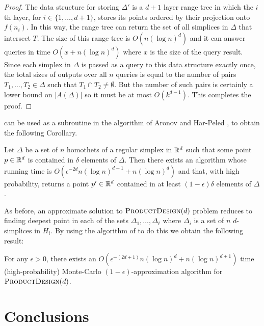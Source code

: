 \documentclass[lotsofwhite]{patmorin}
\newcommand{\eps}{\epsilon}
\begin{document}
\begin{proof}
  The data structure for storing $\Delta'$ is a $d+1$ layer range tree
  \cite{b75} in which the $i$th layer, for $i\in\{1,\ldots,d+1\}$,
  stores its points ordered by their projection onto $f(n_i)$.  In this
  way, the range tree can return the set of all simplices in $\Delta$ that
  intersect $T$.  The size of this range tree is $O(n(\log n)^{d})$
  and it can answer queries in time $O(x+n(\log n)^{d})$ where $x$
  is the size of the query result.  Since each simplex in $\Delta$
  is passed as a query to this data structure exactly once, the total
  sizes of outputs over all $n$ queries is equal to the number of
  pairs $T_1,\ldots,T_2\in\Delta$ such that $T_1\cap T_2\neq\emptyset$.
  But the number of such pairs is certainly a lower bound on $|A(\Delta)|$
  so it must be at most $O(k^{d-1})$.  This completes the proof.
\end{proof}

 can be used as a subroutine in the
algorithm of Aronov and Har-Peled \cite[Theorem~3.3]{ah08}, to obtain
the following Corollary.

\begin{cor}
  Let $\Delta$ be a set of $n$ homothets of a regular simplex in $\mathbb{R}^d$
  such that some point $p\in\mathbb{R}^d$ is contained in $\delta$ elements
  of $\Delta$.  Then there exists an algorithm whose running time is
  $O(\eps^{-2d}n(\log n)^{d-1} + n(\log n)^d)$ and that, with high
  probability, returns a point $p'\in\mathbb{R}^{d}$ contained in at least
  $(1-\eps)\delta$ elements of $\Delta$.
\end{cor}

As before, an approximate solution to $\textsc{ProductDesign}(d)$ problem
reduces to finding deepest point in each of the sets
$\Delta_1,\ldots,\Delta_\ell$ where $\Delta_i$ is a set of $n$
$d$-simplices in $H_i$.  By using the algorithm of  to
do this we obtain the following result:

\begin{thm}
  For any $\eps >0$, there exists an $O(\eps^{-(2d+1)}n(\log n)^d + n(\log
  n)^{d+1})$ time (high-probability) Monte-Carlo $(1-\eps)$-approximation
  algorithm for $\textsc{ProductDesign}(d)$.
\end{thm}

\section{Conclusions}
\end{document}
